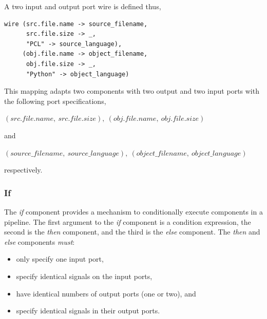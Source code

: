 A two input and output port wire is defined thus,
\begin{center}
  \begin{verbatim}
wire (src.file.name -> source_filename,
      src.file.size -> _,
      "PCL" -> source_language),
     (obj.file.name -> object_filename,
      obj.file.size -> _,
      "Python" -> object_language)
  \end{verbatim}
\end{center}
This mapping adapts two components with two output and two input ports with the following port specifications,
\begin{center}
$(src.file.name,\ src.file.size),\ (obj.file.name,\ obj.file.size)$
\end{center}
and
\begin{center}
$(source\_filename,\ source\_language),\ (object\_filename,\ object\_language)$
\end{center}
respectively.

\subsubsection{If}\label{sec:if}
The \emph{if} component provides a mechanism to conditionally execute components in a pipeline. The first argument to the \emph{if} component is a condition expression, the second is the \emph{then} component, and the third is the \emph{else} component. The \emph{then} and \emph{else} components \emph{must}:
\begin{itemize}
\item only specify one input port,
\item specify identical signals on the input ports,
\item have identical numbers of output ports (one or two), and
\item specify identical signals in their output ports.
\end{itemize}

